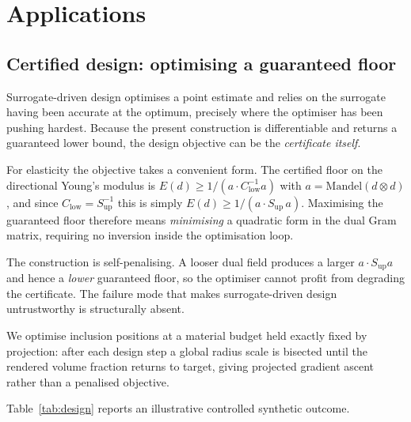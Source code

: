 
\section{Applications}
\label{sec:applications}

\subsection{Certified design: optimising a guaranteed floor}
\label{sec:applications:design}

Surrogate-driven design optimises a point estimate and relies on the
surrogate having been accurate at the optimum, precisely where the optimiser has been pushing hardest. Because the present construction is
differentiable and returns a guaranteed lower bound, the design objective
can be the \emph{certificate itself}.

For elasticity the objective takes a convenient form. The certified floor
on the directional Young's modulus is
$E(d) \ge 1 / (a \cdot C_{\mathrm{low}}^{-1} a)$ with
$a = \mathrm{Mandel}(d \otimes d)$, and since
$C_{\mathrm{low}} = S_{\mathrm{up}}^{-1}$ this is simply
$E(d) \ge 1/(a \cdot S_{\mathrm{up}}\, a)$. Maximising the guaranteed floor
therefore means \emph{minimising} a quadratic form in the dual Gram matrix,
requiring no inversion inside the optimisation loop.

The construction is self-penalising. A looser dual field produces a larger
$a \cdot S_{\mathrm{up}} a$ and hence a \emph{lower} guaranteed floor, so
the optimiser cannot profit from degrading the certificate. The failure
mode that makes surrogate-driven design untrustworthy is structurally
absent.

We optimise inclusion positions at a material budget held exactly fixed by
projection: after each design step a global radius scale is bisected until
the rendered volume fraction returns to target, giving projected gradient
ascent rather than a penalised objective.

Table~\ref{tab:design} reports an illustrative controlled synthetic outcome.

